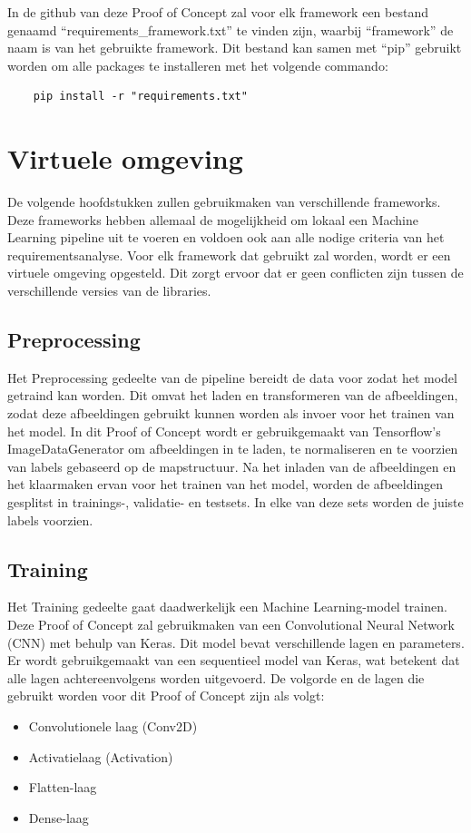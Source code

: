 In de github van deze Proof of Concept zal voor elk framework een bestand genaamd ``requirements\_framework.txt'' te vinden zijn, waarbij ``framework'' de naam is van het gebruikte framework. Dit bestand kan samen met ``pip'' gebruikt worden om alle packages te installeren met het volgende commando:

\begin{verbatim}
    pip install -r "requirements.txt"
\end{verbatim}
\section{Virtuele omgeving}

De volgende hoofdstukken zullen gebruikmaken van verschillende frameworks. Deze frameworks hebben allemaal de mogelijkheid om lokaal een Machine Learning pipeline uit te voeren en voldoen ook aan alle nodige criteria van het requirementsanalyse.
Voor elk framework dat gebruikt zal worden, wordt er een virtuele omgeving opgesteld. Dit zorgt ervoor dat er geen conflicten zijn tussen de verschillende versies van de libraries.

\subsection{Preprocessing}
Het Preprocessing gedeelte van de pipeline bereidt de data voor zodat het model getraind kan worden. Dit omvat het laden en transformeren van de afbeeldingen, zodat deze afbeeldingen gebruikt kunnen worden als invoer voor het trainen van het model. In dit Proof of Concept wordt er gebruikgemaakt van Tensorflow's ImageDataGenerator om afbeeldingen in te laden, te normaliseren en te voorzien van labels gebaseerd op de mapstructuur. Na het inladen van de afbeeldingen en het klaarmaken ervan voor het trainen van het model, worden de afbeeldingen gesplitst in trainings-, validatie- en testsets. In elke van deze sets worden de juiste labels voorzien.
\subsection{Training}
Het Training gedeelte gaat daadwerkelijk een Machine Learning-model trainen. Deze Proof of Concept zal gebruikmaken van een Convolutional Neural Network (CNN) met behulp van Keras. Dit model bevat verschillende lagen en parameters. Er wordt gebruikgemaakt van een sequentieel model van Keras, wat betekent dat alle lagen achtereenvolgens worden uitgevoerd. De volgorde en de lagen die gebruikt worden voor dit Proof of Concept zijn als volgt:
\begin{itemize}
    \item Convolutionele laag (Conv2D)
    \item Activatielaag (Activation)
    \item Flatten-laag
    \item Dense-laag
\end{itemize}
